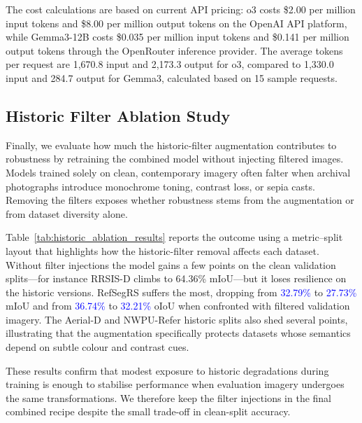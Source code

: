 The cost calculations are based on current API pricing: o3 costs \$2.00 per million input tokens and \$8.00 per million output tokens on the OpenAI API platform, while Gemma3-12B costs \$0.035 per million input tokens and \$0.141 per million output tokens through the OpenRouter inference provider. The average tokens per request are 1,670.8 input and 2,173.3 output for o3, compared to 1,330.0 input and 284.7 output for Gemma3, calculated based on 15 sample requests.

\subsection{Historic Filter Ablation Study}

Finally, we evaluate how much the historic-filter augmentation contributes to robustness by retraining the combined model without injecting filtered images. Models trained solely on clean, contemporary imagery often falter when archival photographs introduce monochrome toning, contrast loss, or sepia casts. Removing the filters exposes whether robustness stems from the augmentation or from dataset diversity alone.

Table~\ref{tab:historic_ablation_results} reports the outcome using a metric–split layout that highlights how the historic-filter removal affects each dataset. Without filter injections the model gains a few points on the clean validation splits—for instance RRSIS-D climbs to 64.36\% mIoU—but it loses resilience on the historic versions. RefSegRS suffers the most, dropping from \textcolor{blue}{32.79\%} to \textcolor{blue}{27.73\%} mIoU and from \textcolor{blue}{36.74\%} to \textcolor{blue}{32.21\%} oIoU when confronted with filtered validation imagery. The Aerial-D and NWPU-Refer historic splits also shed several points, illustrating that the augmentation specifically protects datasets whose semantics depend on subtle colour and contrast cues.

These results confirm that modest exposure to historic degradations during training is enough to stabilise performance when evaluation imagery undergoes the same transformations. We therefore keep the filter injections in the final combined recipe despite the small trade-off in clean-split accuracy.

